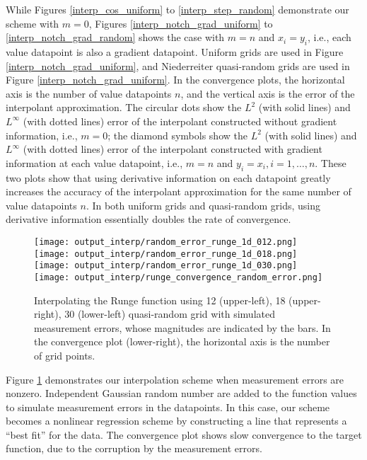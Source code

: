 While Figures \ref{interp_cos_uniform} to \ref{interp_step_random} demonstrate
our scheme with $m=0$, Figures \ref{interp_notch_grad_uniform} to
\ref{interp_notch_grad_random} shows the case with $m=n$ and $x_i=y_i$, i.e.,
each value datapoint is also a gradient datapoint.  Uniform grids are
used in Figure \ref{interp_notch_grad_uniform}, and Niederreiter quasi-random
grids are used in Figure \ref{interp_notch_grad_uniform}.
In the convergence plots, the horizontal
axis is the number of value datapoints $n$, and the vertical axis is the
error of the interpolant approximation.  The circular dots show the $L^2$
(with solid lines) and $L^\infty$ (with dotted lines) error of the
interpolant constructed without gradient information, i.e., $m=0$;
the diamond symbols show the $L^2$ (with solid lines) and $L^\infty$
(with dotted lines) error of the interpolant constructed with gradient
information at each value datapoint, i.e., $m=n$ and
$y_i=x_i, i=1,\ldots,n$.  These two plots show that
using derivative information on each datapoint greatly increases the accuracy
of the interpolant approximation for the same number of value datapoints $n$.
In both uniform grids and quasi-random grids, using derivative information
essentially doubles the rate of convergence.

\begin{figure}[htb!] \centering
\texttt{[image: output\_interp/random\_error\_runge\_1d\_012.png]}
\texttt{[image: output\_interp/random\_error\_runge\_1d\_018.png]}
\texttt{[image: output\_interp/random\_error\_runge\_1d\_030.png]}
\texttt{[image: output\_interp/runge\_convergence\_random\_error.png]}
\caption{Interpolating the Runge function using 12 (upper-left),
         18 (upper-right), 30 (lower-left) quasi-random grid with
         simulated measurement errors, whose magnitudes are indicated by
         the bars.
         In the convergence plot (lower-right), the horizontal axis is the
         number of grid points.}
\label{interp_runge_random_error}
\end{figure}
Figure \ref{interp_runge_random_error} demonstrates our interpolation scheme
when measurement errors are nonzero.  Independent Gaussian random number are
added to the function values to simulate measurement errors in the datapoints.
In this case, our scheme becomes a
nonlinear regression scheme by constructing a line that represents a ``best
fit'' for the data.  The convergence plot shows slow convergence to the target
function, due to the corruption by the measurement errors.


